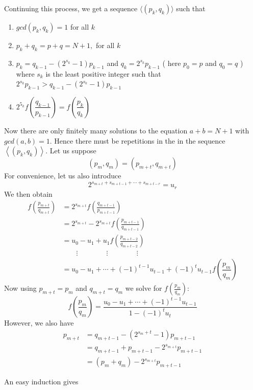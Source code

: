 \documentclass[12pt]{article}
\begin{document}
Continuing this process, we get a sequence $\langle\left(p_{k}, q_{k}\right)\rangle$ such that
\begin{enumerate}
\item $gcd\left(p_{k}, q_{k}\right)=1$ for all $k$
\item $p_{k}+q_{k}=p+q=N+1,$ for all $k$
\item $p_{k}=q_{k-1}-\left(2^{s_{k}}-1\right) p_{k-1}$ and $q_{k}=2^{s_{k}} p_{k-1}$ ( here
$p_{0}=p$ and $q_{0}=q$ ) where $s_{k}$ is the least positive integer such that $2^{s_{k}} p_{k-1}>q_{k-1}-\left(2^{s_{k}}-1\right) p_{k-1}$
\item $2^{5_{k}} f\left(\dfrac{q_{k-1}}{p_{k-1}}\right)=f\left(\dfrac{p_{k}}{q_{k}}\right)$
\end{enumerate}

Now there are only finitely many solutions to the equation $a+b=N+1$ with $gcd(a, b)=1$. Hence there must be repetitions in the in the sequence $\left\langle\left(p_{k}, q_{k}\right)\right\rangle$. Let us suppose
$$
\left(p_{m}, q_{m}\right)=\left(p_{m+t}, q_{m+t}\right)
$$
For convenience, let us also introduce
$$
2^{s_{m+t}+s_{m+t-1}+\cdots+s_{m+t-r}}=u_{r}
$$
We then obtain
$$
\begin{aligned}
f\left(\frac{p_{m+t}}{q_{m+t}}\right) &=2^{s_{m+t}} f\left(\frac{q_{m+t-1}}{p_{m+t-1}}\right) \\
&=2^{s_{m+t}}-2^{s_{m+t}} f\left(\frac{p_{m+t-1}}{q_{m+t-1}}\right) \\
&=u_{0}-u_{1}+u_{1} f\left(\frac{p_{m+t-2}}{q_{m+t-2}}\right) \\
 & \qquad\vdots\qquad \qquad\vdots \qquad\qquad\vdots\\
&=u_{0}-u_{1}+\cdots+(-1)^{t-1} u_{t-1} +(-1)^tu_{t-1}f\left(\dfrac{p_m}{q_m}\right)
\end{aligned}
$$
Now using $p_{m+t}=p_{m}$ and $q_{m+t}=q_{m}$ we solve for $f\left(\frac{p_{m}}{q_{m}}\right):$
$$
f\left(\frac{p_{m}}{q_{m}}\right)=\frac{u_{0}-u_{1}+\cdots+(-1)^{t-1} u_{t-1}}{1-(-1)^{t} u_{t}}
$$
However, we also have
\begin{align*}
p_{m+t} &=q_{m+t-1}-\left(2^{s_{m}+t}-1\right) p_{m+t-1} \\
&=q_{m+t-1}+p_{m+t-1}-2^{s_{m+t}} p_{m+t-1} \\
&=\left(p_{m}+q_{m}\right)-2^{s_{m+t}} p_{m+t-1}
\end{align*}

An easy induction gives
\end{document}
